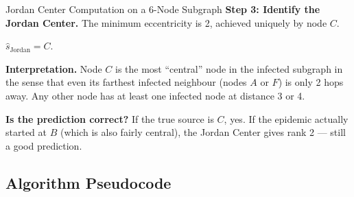 \begin{examplebox}{Jordan Center Computation on a 6-Node Subgraph}
\textbf{Step 3: Identify the Jordan Center.}
The minimum eccentricity is 2, achieved uniquely by node $C$.

$\hat{s}_{\text{Jordan}} = C$.

\textbf{Interpretation.} Node $C$ is the most ``central'' node in the infected
subgraph in the sense that even its farthest infected neighbour (nodes $A$ or $F$) is
only 2 hops away. Any other node has at least one infected node at distance 3 or 4.

\textbf{Is the prediction correct?} If the true source is $C$, yes. If the epidemic
actually started at $B$ (which is also fairly central), the Jordan Center gives rank 2
--- still a good prediction.
\end{examplebox}

\subsection{Algorithm Pseudocode}

